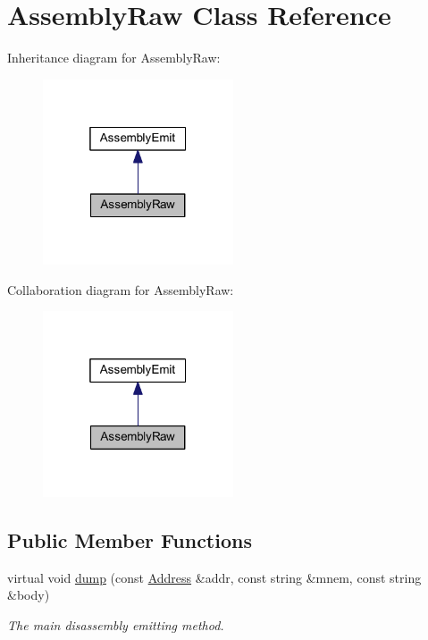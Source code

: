\hypertarget{class_assembly_raw}{}\section{Assembly\+Raw Class Reference}
\label{class_assembly_raw}


Inheritance diagram for Assembly\+Raw\+:
\nopagebreak
\begin{figure}[H]
\begin{center}
\leavevmode
\includegraphics[width=160pt]{class_assembly_raw__inherit__graph}
\end{center}
\end{figure}


Collaboration diagram for Assembly\+Raw\+:
\nopagebreak
\begin{figure}[H]
\begin{center}
\leavevmode
\includegraphics[width=160pt]{class_assembly_raw__coll__graph}
\end{center}
\end{figure}
\subsection*{Public Member Functions}
\begin{DoxyCompactItemize}
\item 
virtual void \mbox{\hyperlink{class_assembly_raw_aafc6f15595f048c5e5ce4f055eab200d}{dump}} (const \mbox{\hyperlink{class_address}{Address}} \&addr, const string \&mnem, const string \&body)
\begin{DoxyCompactList}\small\item\em The main disassembly emitting method. \end{DoxyCompactList}\end{DoxyCompactItemize}


